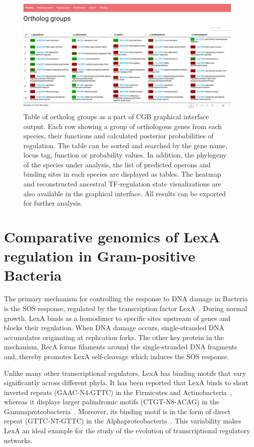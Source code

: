 \begin{figure}
  \centering
  \includegraphics[width=\textwidth]{figures/chapter4/output}
  \caption{Table of ortholog groups as a part of CGB graphical interface
    output. Each row showing a group of orthologous genes from each species,
    their functions and calculated posterior probabilities of regulation. The
    table can be sorted and searched by the gene name, locus tag, function or
    probability values. In addition, the phylogeny of the species under
    analysis, the list of predicted operons and binding sites in each species
    are displayed as tables. The heatmap and reconstructed ancestral
    TF-regulation state visualizations are also available in the graphical
    interface. All results can be exported for further analysis.}
  \label{fig:gui-output}
\end{figure}

\section{Comparative genomics of LexA regulation in Gram-positive Bacteria}

The primary mechanism for controlling the response to DNA damage in Bacteria is
the SOS response, regulated by the transcription factor
LexA~\citep{radman1975sos, erill2007aeons, michel2005after}. During normal
growth, LexA binds as a homodimer to specific sites upstream of genes and
blocks their regulation. When DNA damage occurs, single-stranded DNA
accumulates originating at replication forks. The other key protein in the
mechanism, RecA forms filaments around the single-stranded DNA fragments and,
thereby promotes LexA self-cleavage which induces the SOS response.

Unlike many other transcriptional regulators, LexA has binding motifs that vary
significantly across different phyla. It has been reported that LexA binds to
short inverted repeats (GAAC-N4-GTTC) in the Firmicutes and
Actinobacteria~\citep{au2005genetic, davis2002definition}, whereas it displays
larger palindromic motifs (CTGT-N8-ACAG) in the
Gammaproteobacteria~\citep{erill2003silico,
  fernandez2000identification}. Moreover, its binding motif is in the form of
direct repeat (GTTC-N7-GTTC) in the
Alphaproteobacteria~\citep{erill2004differences, fernandez1998identification}.
This variability makes LexA an ideal example for the study of the evolution
of transcriptional regulatory networks.


